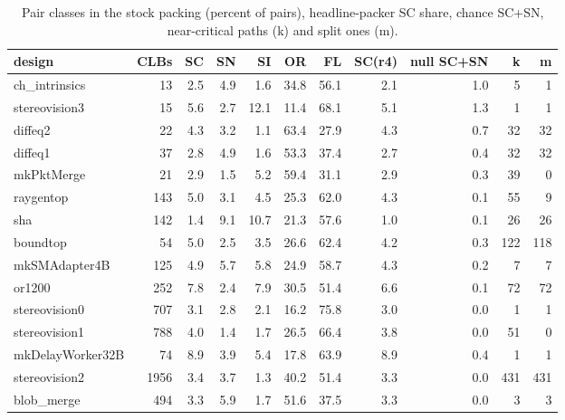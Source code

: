 \begin{table}[t]
\caption{Pair classes in the stock packing (percent of pairs), headline-packer SC share, chance SC+SN, near-critical paths (k) and split ones (m).}
\label{tab:r4census}
\centering\scriptsize\setlength{\tabcolsep}{2pt}
\begin{tabular}{@{}lrrrrrrrrrr@{}}
\toprule
design & CLBs & SC & SN & SI & OR & FL & SC(r4) & null SC+SN & k & m \\
\midrule
ch\_intrinsics & 13 & 2.5 & 4.9 & 1.6 & 34.8 & 56.1 & 2.1 & 1.0 & 5 & 1 \\
stereovision3 & 15 & 5.6 & 2.7 & 12.1 & 11.4 & 68.1 & 5.1 & 1.3 & 1 & 1 \\
diffeq2 & 22 & 4.3 & 3.2 & 1.1 & 63.4 & 27.9 & 4.3 & 0.7 & 32 & 32 \\
diffeq1 & 37 & 2.8 & 4.9 & 1.6 & 53.3 & 37.4 & 2.7 & 0.4 & 32 & 32 \\
mkPktMerge & 21 & 2.9 & 1.5 & 5.2 & 59.4 & 31.1 & 2.9 & 0.3 & 39 & 0 \\
raygentop & 143 & 5.0 & 3.1 & 4.5 & 25.3 & 62.0 & 4.3 & 0.1 & 55 & 9 \\
sha & 142 & 1.4 & 9.1 & 10.7 & 21.3 & 57.6 & 1.0 & 0.1 & 26 & 26 \\
boundtop & 54 & 5.0 & 2.5 & 3.5 & 26.6 & 62.4 & 4.2 & 0.3 & 122 & 118 \\
mkSMAdapter4B & 125 & 4.9 & 5.7 & 5.8 & 24.9 & 58.7 & 4.3 & 0.2 & 7 & 7 \\
or1200 & 252 & 7.8 & 2.4 & 7.9 & 30.5 & 51.4 & 6.6 & 0.1 & 72 & 72 \\
stereovision0 & 707 & 3.1 & 2.8 & 2.1 & 16.2 & 75.8 & 3.0 & 0.0 & 1 & 1 \\
stereovision1 & 788 & 4.0 & 1.4 & 1.7 & 26.5 & 66.4 & 3.8 & 0.0 & 51 & 0 \\
mkDelayWorker32B & 74 & 8.9 & 3.9 & 5.4 & 17.8 & 63.9 & 8.9 & 0.4 & 1 & 1 \\
stereovision2 & 1956 & 3.4 & 3.7 & 1.3 & 40.2 & 51.4 & 3.3 & 0.0 & 431 & 431 \\
blob\_merge & 494 & 3.3 & 5.9 & 1.7 & 51.6 & 37.5 & 3.3 & 0.0 & 3 & 3 \\
\bottomrule
\end{tabular}
\end{table}

